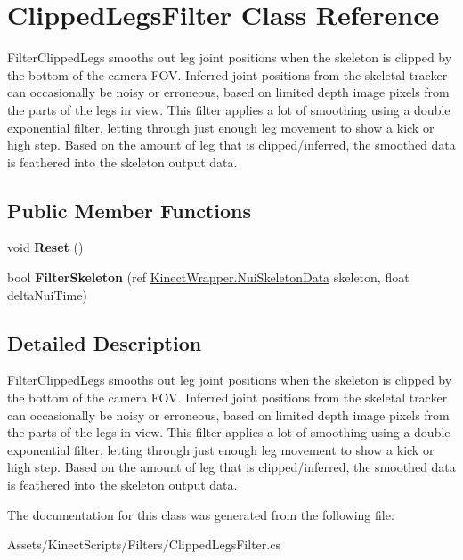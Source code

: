\hypertarget{class_clipped_legs_filter}{}\section{Clipped\+Legs\+Filter Class Reference}
\label{class_clipped_legs_filter}


Filter\+Clipped\+Legs smooths out leg joint positions when the skeleton is clipped by the bottom of the camera F\+OV. Inferred joint positions from the skeletal tracker can occasionally be noisy or erroneous, based on limited depth image pixels from the parts of the legs in view. This filter applies a lot of smoothing using a double exponential filter, letting through just enough leg movement to show a kick or high step. Based on the amount of leg that is clipped/inferred, the smoothed data is feathered into the skeleton output data.  


\subsection*{Public Member Functions}
\begin{DoxyCompactItemize}
\item 
\mbox{\label{class_clipped_legs_filter_a8e0b851496095353a058f36677ec861c}} 
void {\bfseries Reset} ()
\item 
\mbox{\label{class_clipped_legs_filter_a044676e1e38b65570dc9fd47c7394317}} 
bool {\bfseries Filter\+Skeleton} (ref \mbox{\hyperlink{struct_kinect_wrapper_1_1_nui_skeleton_data}{Kinect\+Wrapper.\+Nui\+Skeleton\+Data}} skeleton, float delta\+Nui\+Time)
\end{DoxyCompactItemize}


\subsection{Detailed Description}
Filter\+Clipped\+Legs smooths out leg joint positions when the skeleton is clipped by the bottom of the camera F\+OV. Inferred joint positions from the skeletal tracker can occasionally be noisy or erroneous, based on limited depth image pixels from the parts of the legs in view. This filter applies a lot of smoothing using a double exponential filter, letting through just enough leg movement to show a kick or high step. Based on the amount of leg that is clipped/inferred, the smoothed data is feathered into the skeleton output data. 



The documentation for this class was generated from the following file\+:\begin{DoxyCompactItemize}
\item 
Assets/\+Kinect\+Scripts/\+Filters/Clipped\+Legs\+Filter.\+cs\end{DoxyCompactItemize}
